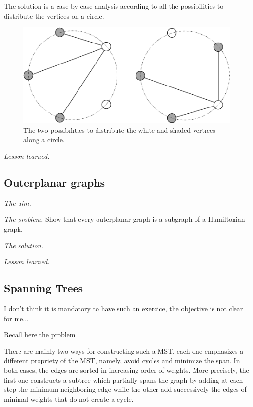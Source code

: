 The solution is a case by case analysis according to all the possibilities to distribute the vertices on a circle.
\begin{figure}[h]
\begin{center}
        \includegraphics[scale=0.4]{FiguresGraph/outerplanarK3,2}
        \caption{The two possibilities to distribute the white and shaded vertices along a circle.}
\end{center}
\end{figure}

\medskip

\noindent \textit{Lesson learned.}


\subsection{Outerplanar graphs}

\noindent \textit{The aim.}

\medskip

\noindent \textit{The problem.}
Show that every outerplanar graph is a subgraph of a Hamiltonian graph.
\medskip

\noindent \textit{The solution.}

\medskip

\noindent \textit{Lesson learned.}



\subsection{Spanning Trees}
\label{Exercice:spanningTrees}

{\Denis I don't think it is mandatory to have such an exercice, the objective is not clear for me...}

Recall here the problem
\medskip

There are mainly two ways for constructing such a MST, each one
emphasizes a different propriety of the MST, namely, avoid cycles and
minimize the span.  In both cases, the edges are sorted in increasing
order of weights.  More precisely, the first one constructs a subtree
which partially spans the graph by adding at each step the minimum
neighboring edge while the other add successively the edges of minimal
weights that do not create a cycle.





